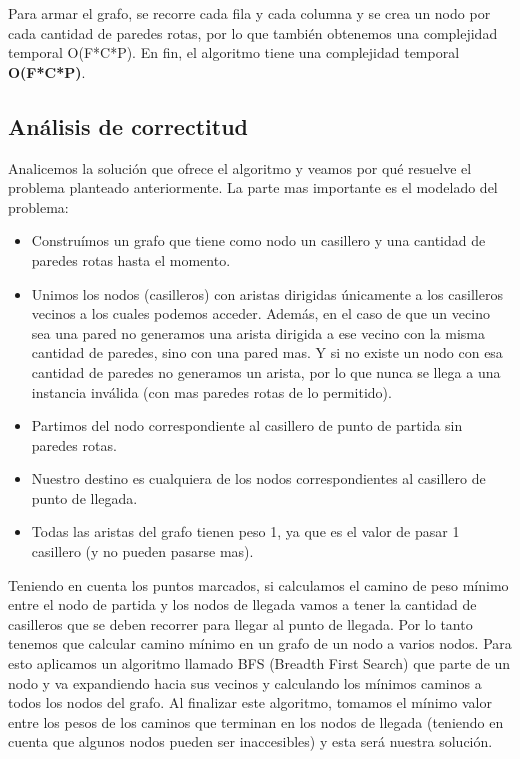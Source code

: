 \par Para armar el grafo, se recorre cada fila y cada columna y se crea un nodo por cada cantidad de paredes rotas, por lo que también obtenemos una complejidad temporal O(F*C*P). En fin, el algoritmo tiene una complejidad temporal \textbf{O(F*C*P)}.

\subsection{Análisis de correctitud}

\par Analicemos la solución que ofrece el algoritmo y veamos por qué resuelve el problema planteado anteriormente. La parte mas importante es el modelado del problema:

\begin{itemize}
	\item Construímos un grafo que tiene como nodo un casillero y una cantidad de paredes rotas hasta el momento.
	\item Unimos los nodos (casilleros) con aristas dirigidas únicamente a los casilleros vecinos a los cuales podemos acceder. Además, en el caso de que un vecino sea una pared no generamos una arista dirigida a ese vecino con la misma cantidad de paredes, sino con una pared mas. Y si no existe un nodo con esa cantidad de paredes no generamos un arista, por lo que nunca se llega a una instancia inválida (con mas paredes rotas de lo permitido).
	\item Partimos del nodo correspondiente al casillero de punto de partida sin paredes rotas.
	\item Nuestro destino es cualquiera de los nodos correspondientes al casillero de punto de llegada.
	\item Todas las aristas del grafo tienen peso 1, ya que es el valor de pasar 1 casillero (y no pueden pasarse mas).
\end{itemize}

\par Teniendo en cuenta los puntos marcados, si calculamos el camino de peso mínimo entre el nodo de partida y los nodos de llegada vamos a tener la cantidad de casilleros que se deben recorrer para llegar al punto de llegada. Por lo tanto tenemos que calcular camino mínimo en un grafo de un nodo a varios nodos. Para esto aplicamos un algoritmo llamado BFS (Breadth First Search) que parte de un nodo y va expandiendo hacia sus vecinos y calculando los mínimos caminos a todos los nodos del grafo. Al finalizar este algoritmo, tomamos el mínimo valor entre los pesos de los caminos que terminan en los nodos de llegada (teniendo en cuenta que algunos nodos pueden ser inaccesibles) y esta será nuestra solución.

